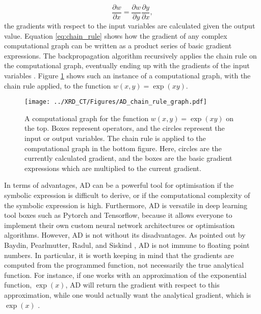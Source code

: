 \begin{equation}\label{eq:chain_rule}
    \frac{\partial w}{\partial x} = \frac{\partial w}{\partial y} \frac{\partial y}{\partial x},
\end{equation}
the gradients with respect to the input variables are calculated given the output value.
Equation \eqref{eq:chain_rule} shows how the gradient of any complex computational graph can be written as a product series of basic gradient expressions.
The backpropagation algorithm recursively applies the chain rule on the computational graph, eventually ending up with the gradients of the input variables \cite{baydin2018automatic}.
Figure \ref{fig:AD_graph} shows such an instance of a computational graph, with the chain rule applied, to the function $w(x,y) = \exp(xy)$.

\clearpage

\begin{figure}[h!]
    \centering
    \texttt{[image: ../XRD\_CT/Figures/AD\_chain\_rule\_graph.pdf]}
    \caption[Computational graph]{A computational graph for the function $w(x,y) = \exp(xy)$ on the top.
        Boxes represent operators, and the circles represent the input or output variables.
        The chain rule is applied to the computational graph in the bottom figure.
        Here, circles are the currently calculated gradient, and the boxes are the basic gradient expressions which are multiplied to the current gradient.
    }
    \label{fig:AD_graph}
\end{figure}

In terms of advantages, AD can be a powerful tool for optimisation if the symbolic expression is difficult to derive, or if the computational complexity of the symbolic expression is high.
Furthermore, AD is versatile in deep learning tool boxes such as Pytorch and Tensorflow,
because it allows everyone to implement their own custom neural network architectures or optimisation algorithms.
However, AD is not without its disadvantages. As pointed out by Baydin, Pearlmutter, Radul, and Siskind \cite{baydin2018automatic},
AD is not immune to floating point numbers.
In particular, it is worth keeping in mind that the gradients are computed from the programmed function, not necessarily the true analytical function.
For instance, if one works with an approximation of the exponential function, $\exp(x)$, AD will return the gradient with respect to this approximation,
while one would actually want the analytical gradient, which is $\exp(x)$ \cite{baydin2018automatic}. %







